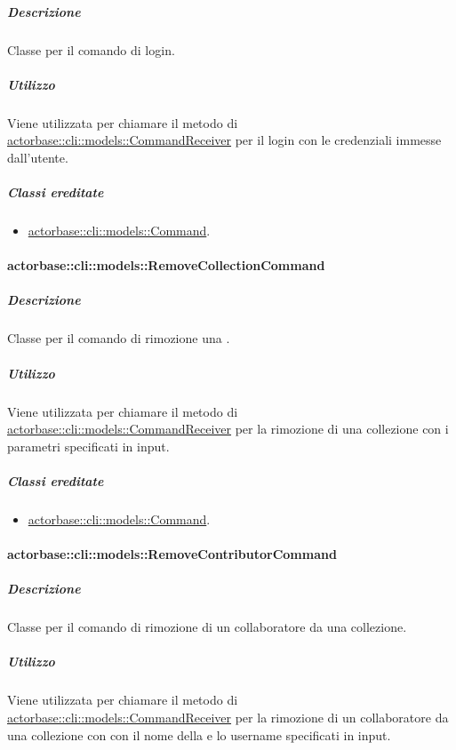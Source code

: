\documentclass{scalatekids-article}
\begin{document}
\subparagraph{Descrizione}

Classe per il comando di login.

\subparagraph{Utilizzo}

Viene utilizzata per chiamare il metodo di
\hyperref[sec:actorbase::cli::models::CommandReceiver]{actorbase::cli::models::CommandReceiver} per il login con le credenziali
immesse dall'utente.

\subparagraph{Classi ereditate}

\begin{itemize}
\item \hyperref[sec:actorbase::cli::models::Command]{actorbase::cli::models::Command}.
\end{itemize}

\paragraph{actorbase::cli::models::RemoveCollectionCommand}
\label{sec:actorbase::cli::models::RemoveCollectionCommand}

\subparagraph{Descrizione}

Classe per il comando di rimozione una .

\subparagraph{Utilizzo}

Viene utilizzata per chiamare il metodo di
\hyperref[sec:actorbase::cli::models::CommandReceiver]{actorbase::cli::models::CommandReceiver} per la rimozione di una collezione con
i parametri specificati in input.

\subparagraph{Classi ereditate}

\begin{itemize}
\item \hyperref[sec:actorbase::cli::models::Command]{actorbase::cli::models::Command}.
\end{itemize}

\paragraph{actorbase::cli::models::RemoveContributorCommand}
\label{sec:actorbase::cli::models::RemoveContributorCommand}

\subparagraph{Descrizione}

Classe per il comando di rimozione di un collaboratore da una collezione.

\subparagraph{Utilizzo}

Viene utilizzata per chiamare il metodo di
\hyperref[sec:actorbase::cli::models::CommandReceiver]{actorbase::cli::models::CommandReceiver} per la rimozione di un collaboratore
da una collezione con con il nome della  e lo username
specificati in input.
\end{document}
